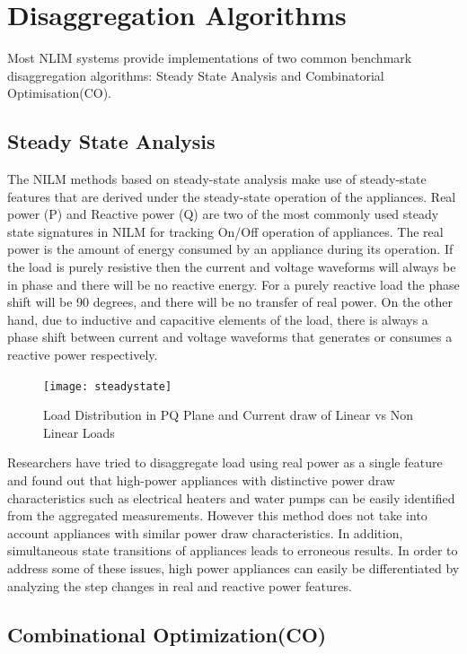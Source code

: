 \section{Disaggregation Algorithms}
Most NLIM systems provide implementations of two common benchmark
disaggregation algorithms: Steady State Analysis and Combinatorial Optimisation(CO).

\subsection{Steady State Analysis}
The NILM methods based on steady-state analysis make use of steady-state features that are derived
under the steady-state operation of the appliances. Real power (P) and Reactive power (Q) are two of the
most commonly used steady state signatures in NILM  for tracking On/Off operation of appliances.
The real power is the amount of energy consumed by an appliance during its operation. If the load is
purely resistive then the current and voltage waveforms will always be in phase and there will be no
reactive energy. For a purely reactive load the phase shift will be 90 degrees, and there will be no transfer of real
power. On the other hand, due to inductive and capacitive elements of the load, there is always a phase
shift between current and voltage waveforms that generates or consumes a reactive power respectively.

\begin{figure}[H]
	\texttt{[image: steadystate]} %
	\caption{Load Distribution in PQ Plane and Current draw of Linear vs Non Linear Loads}
	\label{blck}
\end{figure}

Researchers have tried to disaggregate load using real power as a single feature and found
out that high-power appliances with distinctive power draw characteristics such as electrical heaters and
water pumps can be easily identified from the aggregated measurements. However this method does
not take into account appliances with similar power draw characteristics. In addition, simultaneous state
transitions of appliances leads to erroneous results. In order to address some of these issues, high power appliances can easily be differentiated
by analyzing the step changes in real and reactive power features.

\subsection{Combinational Optimization(CO)}

